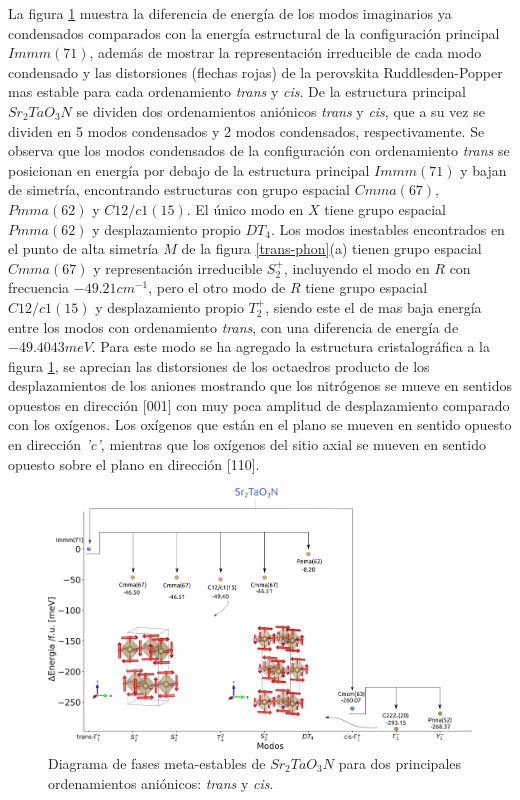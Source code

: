 La figura \ref{Ta-irreps} muestra la diferencia de energía de los modos imaginarios ya condensados comparados con la energía estructural de la configuración principal $Immm(71)$, además de mostrar la representación irreducible de cada modo condensado y las distorsiones (flechas rojas) de la perovskita Ruddlesden-Popper mas estable para cada ordenamiento \emph{trans} y \emph{cis}. De la estructura principal $Sr_{2}TaO_{3}N$ se dividen dos ordenamientos aniónicos \emph{trans} y \emph{cis}, que a su vez se dividen en 5 modos condensados y 2 modos condensados, respectivamente. Se observa que los modos condensados de la configuración con ordenamiento \emph{trans} se posicionan en energía por debajo de la estructura principal $Immm(71)$ y bajan de simetría, encontrando estructuras con grupo espacial $Cmma(67)$, $Pmma(62)$ y $C12/c1(15)$.  El único modo en $X$ tiene grupo espacial $Pmma(62)$ y desplazamiento propio $DT_{4}$. Los modos inestables encontrados en el punto de alta simetría $M$ de la figura \ref{trans-phon}(a) tienen grupo espacial $Cmma(67)$ y representación irreducible $S_{2}^{+}$, incluyendo el modo en $R$ con frecuencia $-49.21cm^{-1}$, pero el otro modo de $R$ tiene grupo espacial $C12/c1(15)$ y desplazamiento propio $T_{2}^{+}$, siendo este el de mas baja energía entre los modos con ordenamiento \emph{trans}, con una diferencia de energía de $-49.4043meV$. Para este modo se ha agregado la estructura cristalográfica a la figura \ref{Ta-irreps}, se aprecian las distorsiones de los octaedros producto de los desplazamientos de los aniones mostrando que los nitrógenos se mueve en sentidos opuestos en dirección [001] con muy poca amplitud de desplazamiento comparado con los oxígenos. Los oxígenos que están en el plano se mueven en sentido opuesto en dirección \emph{'c'}, mientras que los oxígenos del sitio axial se mueven en sentido opuesto sobre el plano en dirección [110].

\begin{figure}[H]
    \centering
    \includegraphics[width=\textwidth]{Figs/Ta-irreps.png}
    \caption{Diagrama de fases meta-estables de $Sr_{2}TaO_{3}N$ para dos principales ordenamientos aniónicos: \emph{trans} y \emph{cis}.}
    \label{Ta-irreps}
\end{figure}

